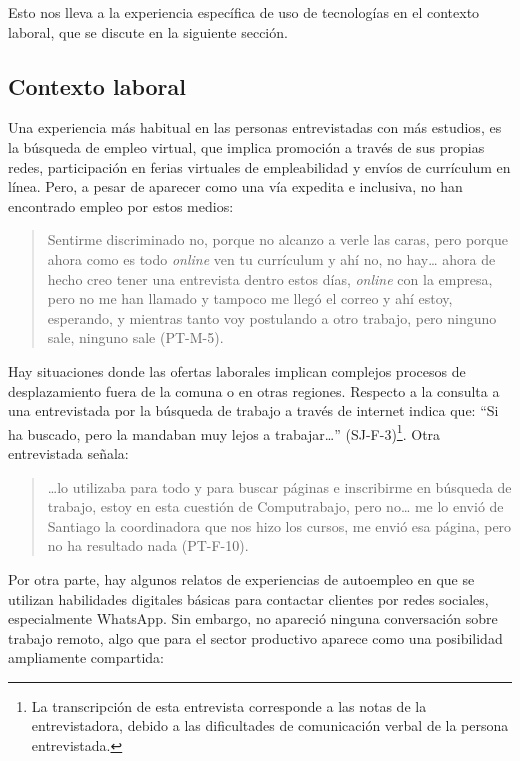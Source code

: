 Esto nos lleva a la experiencia específica de uso de tecnologías en el
contexto laboral, que se discute en la siguiente sección.

\subsection{Contexto laboral}\label{sub-sec-contextolaboral}

Una experiencia más habitual en las personas entrevistadas con más
estudios, es la búsqueda de empleo virtual, que implica promoción a
través de sus propias redes, participación en ferias virtuales de
empleabilidad y envíos de currículum en línea. Pero, a pesar de aparecer
como una vía expedita e inclusiva, no han encontrado empleo por estos
medios:

\begin{quote}
	Sentirme discriminado no, porque no alcanzo a verle las caras, pero
	porque ahora como es todo \emph{online} ven tu currículum y ahí no, no
	hay\ldots{} ahora de hecho creo tener una entrevista dentro estos días,
	\emph{online} con la empresa, pero no me han llamado y tampoco me llegó
	el correo y ahí estoy, esperando, y mientras tanto voy postulando a otro
	trabajo, pero ninguno sale, ninguno sale (PT-M-5).
\end{quote}

Hay situaciones donde las ofertas laborales implican complejos procesos
de desplazamiento fuera de la comuna o en otras regiones. Respecto a la
consulta a una entrevistada por la búsqueda de trabajo a través de
internet indica que: \enquote{Si ha buscado, pero la mandaban muy lejos a
	trabajar\ldots} (SJ-F-3)\footnote{La transcripción de esta entrevista
	corresponde a las notas de la entrevistadora, debido a las
	dificultades de comunicación verbal de la persona entrevistada.}. Otra
entrevistada señala:

\begin{quote}
	\ldots lo utilizaba para todo y para buscar páginas e inscribirme en
	búsqueda de trabajo, estoy en esta cuestión de Computrabajo, pero
	no\ldots{} me lo envió de Santiago la coordinadora que nos hizo los
	cursos, me envió esa página, pero no ha resultado nada (PT-F-10).
\end{quote}

Por otra parte, hay algunos relatos de experiencias de autoempleo en que
se utilizan habilidades digitales básicas para contactar clientes por
redes sociales, especialmente WhatsApp. Sin embargo, no apareció ninguna
conversación sobre trabajo remoto, algo que para el sector productivo
aparece como una posibilidad ampliamente compartida:

